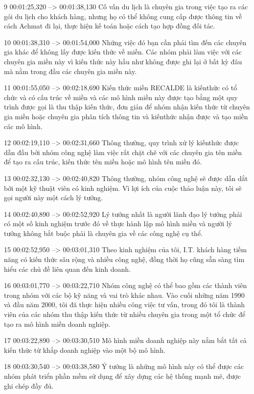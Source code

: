 9
00:01:25,320 --> 00:01:38,130
Cố vấn du lịch là chuyên gia trong việc tạo ra các gói du lịch cho khách hàng, nhưng họ có thể không cung cấp được thông tin về cách Achmat đi lại, thực hiện kế toán hoặc cách tạo hợp đồng đối tác.

10
00:01:38,310 --> 00:01:54,000
Những việc đó bạn cần phải tìm đến các chuyên gia khác để không lấy được kiến ​​thức về miền.  Các nhóm phải làm việc với các chuyên gia miền này vì kiến ​​thức này hầu như không được ghi lại ở bất kỳ đâu mà nằm trong đầu các chuyên gia miền này.

11
00:01:55,050 --> 00:02:18,690
Kiến thức miền RECALDE là kiến ​​thức có tổ chức và có cấu trúc về miền và các mô hình miền này được tạo bằng một quy trình được gọi là thu thập kiến ​​thức, đơn giản để nhóm nhận kiến ​​thức từ chuyên gia miền hoặc chuyên gia phân tích thông tin và kiến ​​thức nhận được và tạo miền  các mô hình.

12
00:02:19,110 --> 00:02:31,660
Thông thường, quy trình xử lý kiến ​​thức được dẫn đầu bởi nhóm công nghệ làm việc rất chặt chẽ với các chuyên gia tên miền để tạo ra cấu trúc, kiến ​​thức tên miền hoặc mô hình tên miền đó.

13
00:02:32,130 --> 00:02:40,820
Thông thường, nhóm công nghệ sẽ được dẫn dắt bởi một kỹ thuật viên có kinh nghiệm.  Vì lợi ích của cuộc thảo luận này, tôi sẽ gọi người này một cách lý tưởng.

14
00:02:40,890 --> 00:02:52,920
Lý tưởng nhất là người lãnh đạo lý tưởng phải có một số kinh nghiệm trước đó về thực hành lập mô hình miền và người lý tưởng không bắt buộc phải là chuyên gia về các công nghệ cụ thể.

15
00:02:52,950 --> 00:03:01,310
Theo kinh nghiệm của tôi, I.T.  khách hàng tiềm năng có kiến ​​thức sâu rộng và nhiều công nghệ, đồng thời họ cũng sẵn sàng tìm hiểu các chủ đề liên quan đến kinh doanh.

16
00:03:01,770 --> 00:03:22,710
Nhóm công nghệ có thể bao gồm các thành viên trong nhóm với các bộ kỹ năng và vai trò khác nhau.  Vào cuối những năm 1990 và đầu năm 2000, tôi đã thực hiện nhiều công việc tư vấn, trong đó tôi là thành viên của các nhóm thu thập kiến ​​thức từ nhiều chuyên gia trong một tổ chức để tạo ra mô hình miền doanh nghiệp.

17
00:03:22,890 --> 00:03:30,510
Mô hình miền doanh nghiệp này nắm bắt tất cả kiến ​​thức từ khắp doanh nghiệp vào một bộ mô hình.

18
00:03:30,540 --> 00:03:38,580
Ý tưởng là những mô hình này có thể được các nhóm phát triển phần mềm sử dụng để xây dựng các hệ thống mạnh mẽ, được ghi chép đầy đủ.

